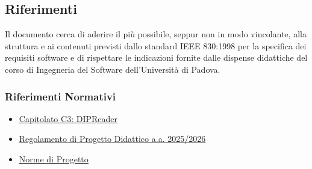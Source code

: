 \subsection{Riferimenti}
Il documento cerca di aderire il più possibile, seppur non in modo vincolante, alla struttura e ai contenuti previsti dallo standard IEEE 830:1998 per la specifica dei requisiti software e di rispettare le indicazioni fornite dalle dispense didattiche del corso di Ingegneria del Software dell'Università di Padova.

\subsubsection{Riferimenti Normativi}
\begin{itemize}
    \item \href{https://www.math.unipd.it/~tullio/IS-1/2025/Progetto/C3.pdf}{\ul{Capitolato C3: DIPReader}} 
    \item \href{https://www.math.unipd.it/~tullio/IS-1/2025/Dispense/PD1.pdf}{\ul{Regolamento di Progetto Didattico a.a. 2025/2026}} 
    \item \href{https://cdn.jsdelivr.net/gh/7-zpus/Docs@main/2_RTB/NormeDiProgetto.pdf}{\ul{Norme di Progetto}} 
\end{itemize}

